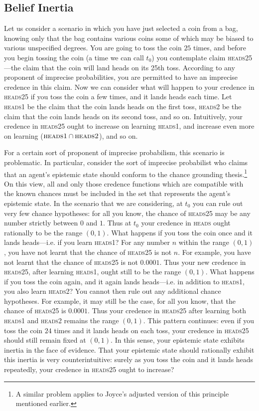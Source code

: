 \subsection{Belief Inertia}

Let us consider a scenario in which you have just selected a coin from a bag, knowing only that the bag contains various coins some of which may be biased to various unspecified degrees. You are going to toss the coin $25$ times, and before you begin tossing the coin (a time we can call $t_0$) you contemplate claim \textsc{heads25}---the claim that the coin will land heads on its 25th toss. According to any proponent of imprecise probabilities, you are permitted to have an imprecise credence in this claim. Now we can consider what will happen to your credence in \textsc{heads25} if you toss the coin a few times, and it lands heads each time. Let \textsc{heads1} be the claim that the coin lands heads on the first toss, 	\textsc{heads2} be the claim that the coin lands heads on its second toss, and so on. Intuitively, your credence in \textsc{heads25} ought to increase on learning \textsc{heads1}, and increase even more on learning ($\textsc{heads1} \cap \textsc{heads2}$), and so on.
 
For a certain sort of proponent of imprecise probabilism, this scenario is problematic. In particular, consider the sort of imprecise probabilist who claims that an agent's epistemic state should conform to the chance grounding thesis.\footnote{A similar problem applies to Joyce's adjusted version of this principle mentioned earlier.} On this view, all and only those credence functions which are compatible with the known chances must be included in the set that represents the agent's epistemic state. In the scenario that we are considering, at $t_0$ you can rule out very few chance hypotheses: for all you know, the chance of \textsc{heads25} may be any number strictly between $0$ and $1$. Thus at $t_0$ your credence in \textsc{heads} ought rationally to be the range $(0,1)$. What happens if you toss the coin once and it lands heads---i.e. if you learn \textsc{heads1}? For any number $n$ within the range $(0,1)$, you have not learnt that the chance of \textsc{heads25} is not $n$. For example, you have not learnt that the chance of \textsc{heads25} is not $0.0001$. Thus your new credence in \textsc{heads25}, after learning \textsc{heads1}, ought still to be the range $(0,1)$. What happens if you toss the coin again, and it again lands heads---i.e. in addition to \textsc{heads1}, you also learn \textsc{heads2}? You cannot then rule out any additional chance hypotheses. For example, it may still be the case, for all you know, that the chance of \textsc{heads25} is $0.0001$. Thus your credence in \textsc{heads25} after learning both \textsc{heads1} and \textsc{heads2} remains the range $(0,1)$. This pattern continues: even if you toss the coin $24$ times and it lands heads on each toss, your credence in \textsc{heads25} should still remain fixed at $(0,1)$. In this sense, your epistemic state exhibits inertia in the face of evidence. That your epistemic state should rationally exhibit this inertia is very counterintuitive: surely as you toss the coin and it lands heads repeatedly, your credence in \textsc{heads25} ought to increase?


